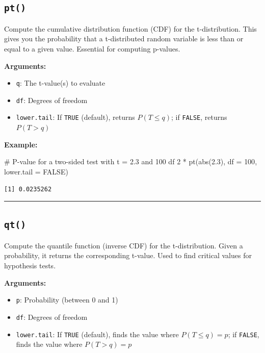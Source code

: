 \documentclass[
  letterpaper,
  DIV=11,
  numbers=noendperiod]{scrreprt}
\newenvironment{Shaded}{\begin{snugshade}}{\end{snugshade}}
\newcommand{\AttributeTok}[1]{\textcolor[rgb]{0.40,0.45,0.13}{#1}}
\newcommand{\CommentTok}[1]{\textcolor[rgb]{0.37,0.37,0.37}{#1}}
\newcommand{\ConstantTok}[1]{\textcolor[rgb]{0.56,0.35,0.01}{#1}}
\newcommand{\DecValTok}[1]{\textcolor[rgb]{0.68,0.00,0.00}{#1}}
\newcommand{\FloatTok}[1]{\textcolor[rgb]{0.68,0.00,0.00}{#1}}
\newcommand{\FunctionTok}[1]{\textcolor[rgb]{0.28,0.35,0.67}{#1}}
\newcommand{\NormalTok}[1]{\textcolor[rgb]{0.00,0.23,0.31}{#1}}
\newcommand{\SpecialCharTok}[1]{\textcolor[rgb]{0.37,0.37,0.37}{#1}}
\providecommand{\tightlist}{%
  \setlength{\itemsep}{0pt}\setlength{\parskip}{0pt}}
\begin{document}
\subsection{\texorpdfstring{\texttt{pt()}}{pt()}}\label{pt}

Compute the cumulative distribution function (CDF) for the
t-distribution. This gives you the probability that a t-distributed
random variable is less than or equal to a given value. Essential for
computing p-values.

\textbf{Arguments:}

\begin{itemize}
\tightlist
\item
  \texttt{q}: The t-value(s) to evaluate
\item
  \texttt{df}: Degrees of freedom
\item
  \texttt{lower.tail}: If \texttt{TRUE} (default), returns
  \(P(T \leq q)\); if \texttt{FALSE}, returns \(P(T > q)\)
\end{itemize}

\textbf{Example:}

\begin{Shaded}
\begin{Highlighting}[]
\CommentTok{\# P{-}value for a two{-}sided test with t = 2.3 and 100 df}
\DecValTok{2} \SpecialCharTok{*} \FunctionTok{pt}\NormalTok{(}\FunctionTok{abs}\NormalTok{(}\FloatTok{2.3}\NormalTok{), }\AttributeTok{df =} \DecValTok{100}\NormalTok{, }\AttributeTok{lower.tail =} \ConstantTok{FALSE}\NormalTok{)}
\end{Highlighting}
\end{Shaded}

\begin{verbatim}
[1] 0.0235262
\end{verbatim}

\begin{center}\rule{0.5\linewidth}{0.5pt}\end{center}

\subsection{\texorpdfstring{\texttt{qt()}}{qt()}}\label{qt}

Compute the quantile function (inverse CDF) for the t-distribution.
Given a probability, it returns the corresponding t-value. Used to find
critical values for hypothesis tests.

\textbf{Arguments:}

\begin{itemize}
\tightlist
\item
  \texttt{p}: Probability (between 0 and 1)
\item
  \texttt{df}: Degrees of freedom
\item
  \texttt{lower.tail}: If \texttt{TRUE} (default), finds the value where
  \(P(T \leq q) = p\); if \texttt{FALSE}, finds the value where
  \(P(T > q) = p\)
\end{itemize}
\end{document}
